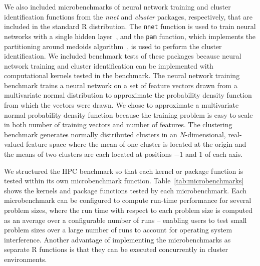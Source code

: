We also included microbenchmarks of neural network training and cluster
  identification functions from the \textit{nnet} and \textit{cluster} packages,
  respectively, that are included in the standard R distribution.
The \texttt{nnet} function is used to train neural networks with a single hidden
  layer~\cite{ripley:pattern96}, and the \texttt{pam} function, which implements
  the partitioning around medoids algorithm~\cite{chu:kmedoids, reynolds:clustering},
  is used to perform the cluster identification.
We included benchmark tests of these packages because neural network training
  and cluster identification can be implemented with computational kernels
  tested in the benchmark.
The neural network training benchmark trains a neural network on a set of
  feature vectors drawn from a multivariate normal distribution to approximate
  the probability density function from which the vectors were drawn.
We chose to approximate a multivariate normal probability density function
  because the training problem is easy to scale in both number of training
  vectors and number of features.
The clustering benchmark generates normally distributed clusters in an
  $N$-dimensional, real-valued feature space where the mean of one cluster is
  located at the origin and the means of two clusters are each located at
  positions $-1$ and $1$ of each axis.

We structured the HPC benchmark so that each kernel or package function is
  tested within its own microbenchmark function.
Table~\ref{tab:microbenchmarks} shows the kernels and package functions tested
  by each microbenchmark.
Each microbenchmark can be configured to compute run-time performance for
  several problem sizes, where the run time with respect to each problem size
  is computed as an average over a configurable number of runs -- enabling
  users to test small problem sizes over a large number of runs to account
  for operating system interference.
Another advantage of implementing the microbenchmarks as separate R functions
  is that they can be executed concurrently in cluster environments.


